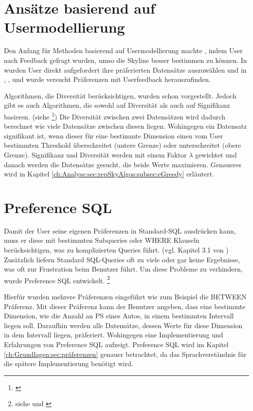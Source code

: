 \section{Ansätze basierend auf Usermodellierung}
\label{ch:Forschungsstand:sec:userModel}
Den Anfang für Methoden basierend auf Usermodellierung machte \cite{948}, indem User nach Feedback gefragt wurden, umso die Skyline besser bestimmen zu können.
In \cite{Lofi10efficientcomputation} wurden User direkt aufgefordert ihre präferierten Datensätze auszuwählen und in \cite{lee2008optimal}, \cite{Mindolin:2009:DRI:1687627.1687697}, \cite{Mindolin:2011:PEP:1969331.1969354} und \cite{Zhao10callto} wurde versucht Präferenzen mit Userfeedback herauszufinden.

Algorithmen, die Diversität berücksichtigen, wurden schon vorgestellt. Jedoch gibt es auch Algorithmen, die sowohl auf Diversität als auch auf Signifikanz basieren. (siehe \footnote{\cite{magnani2014taking}}) Die Diversität zwischen zwei Datensätzen wird dadurch berechnet wie viele Datensätze zwischen diesen liegen. Wohingegen ein Datensatz signifikant ist, wenn dieser für eine bestimmte Dimension einen vom User bestimmten Threshold überschreitet (untere Grenze) oder unterschreitet (obere Grenze).
Signifikanz und Diversität werden mit einem Faktor $\lambda$ gewichtet und danach werden die Datensätze gesucht, die beide Werte maximieren. Genaueres wird in Kapitel \ref{ch:Analyse:sec:repSkyAlgos:subsec:eGreedy} erläutert.
\section{Preference SQL}
\label{ch:Forschungsstand:sec:prefSQL}
Damit der User seine eigenen Präferenzen in Standard-SQL ausdrücken kann, muss er diese mit bestimmten Subqueries oder WHERE Klauseln berücksichtigen, was zu komplizierten Queries führt. (vgl. Kapitel 3.1 von \cite{borzsony2001skyline}) Zusätzlich liefern Standard SQL-Queries oft zu viele oder gar keine Ergebnisse, was oft zur Frustration beim Benutzer führt. Um diese Probleme zu verhindern, wurde Preference SQL entwickelt. \footnote{siehe \cite{kiessling2002foundations} und \cite{kiessling2011preference}}

Hierfür wurden mehrere Präferenzen eingeführt wie zum Beispiel die BETWEEN Präferenz. Mit dieser Präferenz kann der Benutzer angeben, dass eine bestimmte Dimension, wie die Anzahl an PS eines Autos, in einem bestimmten Intervall liegen soll. Daraufhin werden alle Datensätze, dessen Werte für diese Dimension in dem Intervall liegen, präferiert. Wohingegen \cite{kiessling2002preference} eine Implementierung und Erfahrungen von Preference SQL aufzeigt. 
Preference SQL wird im Kapitel \ref{ch:Grundlagen:sec:präferenzen} genauer betrachtet, da das Sprachverständnis für die spätere Implementierung benötigt wird.
